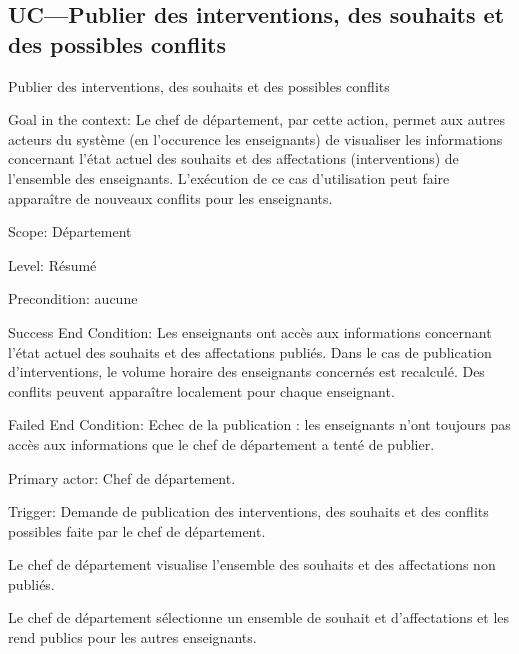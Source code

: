 \begin{ocl}
\subsection{UC---Publier des interventions, des souhaits et des possibles conflits}

\begin{usecase}{Publier des interventions, des souhaits et des possibles conflits}
\label{usecase:publier}
\begin{information}
	
\item[{Goal in the context:}]
 Le chef de département, par cette action, permet aux autres acteurs du système (en l'occurence les enseignants) de visualiser les informations concernant l'état actuel des souhaits et des affectations (interventions) de l'ensemble des enseignants. 
L'exécution de ce cas d'utilisation peut faire apparaître de nouveaux conflits pour les enseignants.

\item[{Scope:}] Département

 \item[{Level:}] Résumé

 \item[Precondition:] aucune

 \item[{Success End Condition:}]
 Les enseignants ont accès aux informations concernant l'état actuel des souhaits et des affectations publiés. Dans le cas de publication d'interventions, le volume horaire des enseignants concernés est recalculé. Des conflits peuvent apparaître localement pour chaque enseignant.

 \item[{Failed End Condition:}]
 Echec de la publication : les enseignants n'ont toujours pas accès aux informations que le chef de département a tenté de publier.

 \item[{Primary actor:}]
 Chef de département.

 \item[{Trigger:}]
 Demande de publication des interventions, des souhaits et des conflits possibles faite par le chef de département.
\end{information}

\begin{scenario}
\item Le chef de département visualise l'ensemble des souhaits et des affectations non publiés.
 \item Le chef de département sélectionne un ensemble de souhait et d'affectations et les rend publics pour les autres enseignants.
\end{scenario}


\end{usecase}
\end{ocl}
